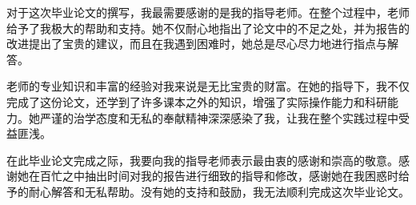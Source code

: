 对于这次毕业论文的撰写，我最需要感谢的是我的指导老师。在整个过程中，老师给予了我极大的帮助和支持。她不仅耐心地指出了论文中的不足之处，并为报告的改进提出了宝贵的建议，而且在我遇到困难时，她总是尽心尽力地进行指点与解答。

老师的专业知识和丰富的经验对我来说是无比宝贵的财富。在她的指导下，我不仅完成了这份论文，还学到了许多课本之外的知识，增强了实际操作能力和科研能力。她严谨的治学态度和无私的奉献精神深深感染了我，让我在整个实践过程中受益匪浅。

在此毕业论文完成之际，我要向我的指导老师表示最由衷的感谢和崇高的敬意。感谢她在百忙之中抽出时间对我的报告进行细致的指导和修改，感谢她在我困惑时给予的耐心解答和无私帮助。没有她的支持和鼓励，我无法顺利完成这次毕业论文。